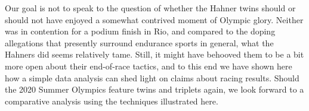 \documentclass[12pt,titlepage]{article}
\begin{document}
Our goal is not to speak to the question of whether the Hahner twins
should or should not have enjoyed a somewhat contrived moment of
Olympic glory. Neither was in contention for a podium finish in Rio,
and compared to the doping allegations that presently surround
endurance sports in general, what the Hahners did seems relatively
tame. Still, it might have behooved them to be a bit more open about
their end-of-race tactics, and to this end we have shown here how a
simple data analysis can shed light on claims about racing results.
Should the 2020 Summer Olympics feature twins and triplets again, we
look forward to a comparative analysis using the techniques
illustrated here.




\end{document}
